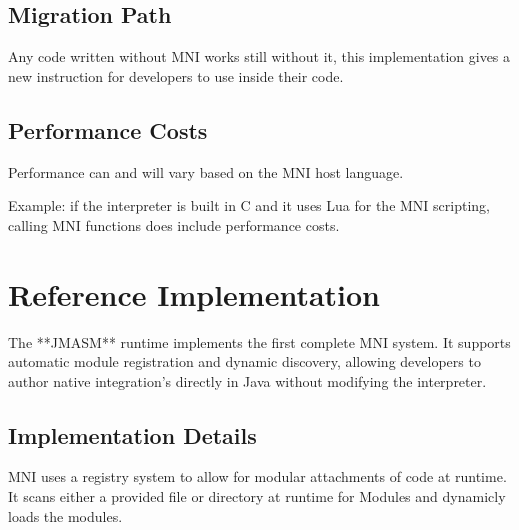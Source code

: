 \documentclass[11pt]{article}
\begin{document}
	
	\subsection{Migration Path}
 	Any code written without MNI works still without it, this implementation gives a new instruction for developers to use inside their code.
	
	\subsection{Performance Costs}
	Performance can and will vary based on the MNI host language.
	
	Example: if the interpreter is built in C and it uses Lua for the MNI scripting, calling MNI functions does include performance costs.
	
	\section{Reference Implementation}
	The **JMASM** runtime implements the first complete MNI system.  
	It supports automatic module registration and dynamic discovery, allowing developers to author native integration's directly in Java without modifying the interpreter.
	
	\subsection{Implementation Details}
	MNI uses a registry system to allow for modular attachments of code at runtime.
	It scans either a provided file or directory at runtime for Modules and dynamicly loads the modules.
	

	
\end{document}
